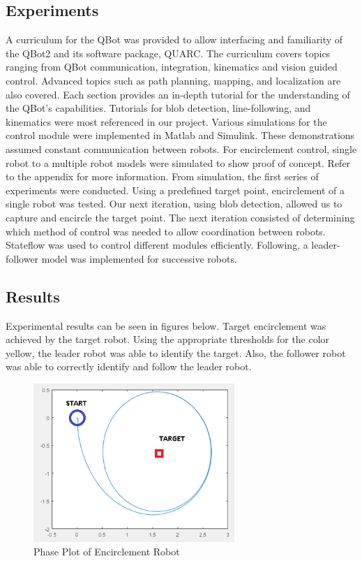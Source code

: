 \documentclass[conference]{IEEEtran}
\begin{document}
\newpage

\subsection{Experiments}
A curriculum for the QBot was provided to allow interfacing and familiarity of the QBot2 and its software package, QUARC. The curriculum covers topics ranging from QBot communication, integration, kinematics and vision guided control. Advanced topics such as path planning, mapping, and localization are also covered. Each section provides an in-depth tutorial for the understanding of the QBot’s capabilities. Tutorials for blob detection, line-following, and kinematics were most referenced in our project.
Various simulations for the control module were implemented in Matlab and Simulink. These demonstrations assumed constant communication between robots. For encirclement control, single robot to a multiple robot models were simulated to show proof of concept. Refer to the appendix for more information.
From simulation, the first series of experiments were conducted. Using a predefined target point, encirclement of a single robot was tested. Our next iteration, using blob detection, allowed us to capture and encircle the target point. The next iteration consisted of determining which method of control was needed to allow coordination between robots. Stateflow was used to control different modules efficiently. Following, a leader-follower model was implemented for successive robots.

\subsection{Results}
Experimental results can be seen in figures below. Target encirclement was achieved by the target robot. Using the appropriate thresholds for the color yellow, the leader robot was able to identify the target. Also, the follower robot was able to correctly identify and follow the leader robot.
\begin{figure}[htbp]
\begin{center}
\includegraphics[width=3in]{11}
\caption{Phase Plot of Encirclement Robot} \label{fig:11}
\end{center}
\end{figure}
\end{document}
